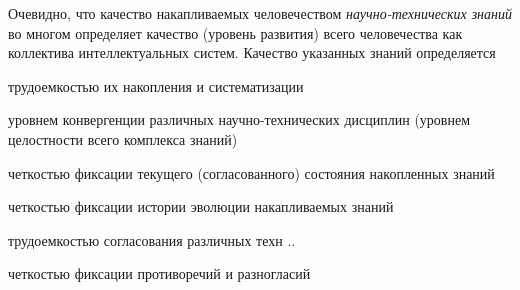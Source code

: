 {\begin{scnitemize}
	\end{scnitemize}
Очевидно, что качество накапливаемых человечеством \textit{научно-технических знаний} во многом определяет качество (уровень развития) всего человечества как коллектива интеллектуальных систем. Качество указанных знаний определяется
\begin{scnitemize}
\item трудоемкостью их накопления и систематизации
\item уровнем конвергенции различных научно-технических дисциплин (уровнем целостности всего комплекса знаний)
\item четкостью фиксации текущего (согласованного) состояния накопленных знаний
\item четкостью фиксации истории эволюции накапливаемых знаний
\item трудоемкостью согласования различных техн ..
\item четкостью фиксации противоречий и разногласий
\end{scnitemize}
}
